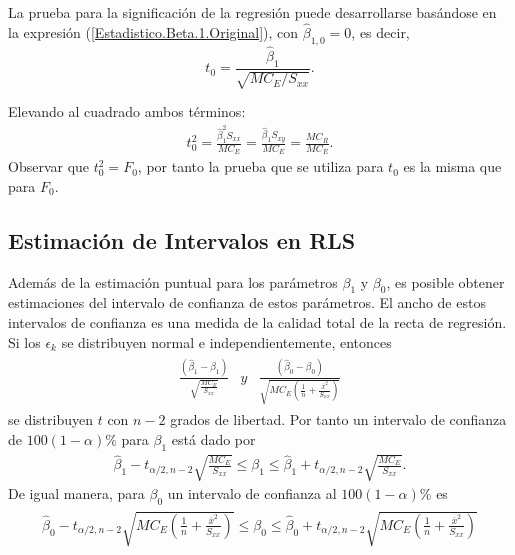 \documentclass[a4paper]{report} %
\begin{document}
La prueba para la significaci\'on de la regresi\'on puede desarrollarse bas\'andose en la expresi\'on (\ref{Estadistico.Beta.1.Original}), con $\hat{\beta}_{1,0}=0$, es decir,
\begin{equation}\label{Estadistico.Beta.1.Cero}
t_{0}=\frac{\hat{\beta}_{1}}{\sqrt{MC_{E}/S_{xx}}}.
\end{equation}

Elevando al cuadrado ambos t\'erminos:
\begin{eqnarray*}
t_{0}^{2}=\frac{\hat{\beta}_{1}^{2}S_{xx}}{MC_{E}}=\frac{\hat{\beta}_{1}S_{xy}}{MC_{E}}=\frac{MC_{R}}{MC_{E}}.
\end{eqnarray*}
Observar que $t_{0}^{2}=F_{0}$, por tanto la prueba que se utiliza para $t_{0}$ es la misma que para $F_{0}$.
\subsection{Estimaci\'on de Intervalos en RLS}

Adem\'as de la estimaci\'on puntual para los par\'ametros $\beta_{1}$ y $\beta_{0}$, es posible obtener estimaciones del intervalo de confianza de estos par\'ametros. El ancho de estos intervalos de confianza es una medida de la calidad total de la recta de regresi\'on. Si los $\epsilon_{k}$ se distribuyen normal e independientemente, entonces
\begin{eqnarray*}
\begin{array}{ccc}
\frac{\left(\hat{\beta}_{1}-\beta_{1}\right)}{\sqrt{\frac{MC_{E}}{S_{xx}}}}&y &\frac{\left(\hat{\beta}_{0}-\beta_{0}\right)}{\sqrt{MC_{E}\left(\frac{1}{n}+\frac{\overline{x}^{2}}{S_{xx}}\right)}}
\end{array}
\end{eqnarray*}
se distribuyen $t$ con $n-2$ grados de libertad. Por tanto un intervalo de confianza de $100\left(1-\alpha\right)\%$ para $\beta_{1}$ est\'a dado por
\begin{eqnarray}
\hat{\beta}_{1}-t_{\alpha/2,n-2}\sqrt{\frac{MC_{E}}{S_{xx}}}\leq \beta_{1}\leq\hat{\beta}_{1}+t_{\alpha/2,n-2}\sqrt{\frac{MC_{E}}{S_{xx}}}.
\end{eqnarray}
De igual manera, para $\beta_{0}$ un intervalo de confianza al $100\left(1-\alpha\right)\%$ es
\begin{eqnarray}
\begin{array}{l}
\hat{\beta}_{0}-t_{\alpha/2,n-2}\sqrt{MC_{E}\left(\frac{1}{n}+\frac{\overline{x}^{2}}{S_{xx}}\right)}\leq\beta_{0}\leq\hat{\beta}_{0}+t_{\alpha/2,n-2}\sqrt{MC_{E}\left(\frac{1}{n}+\frac{\overline{x}^{2}}{S_{xx}}\right)}
\end{array}
\end{eqnarray}
\end{document}

